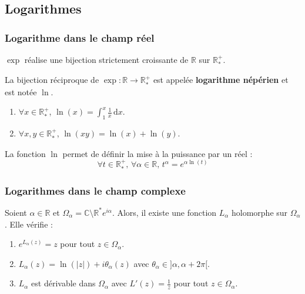   \subsection{Logarithmes}

  \subsubsection{Logarithme dans le champ réel}


  \begin{proposition}
    $\exp$ réalise une bijection strictement croissante de $\mathbb{R}$ sur $\mathbb{R}_*^+$.
  \end{proposition}

  \begin{definition}
    La bijection réciproque de $\exp : \mathbb{R} \rightarrow \mathbb{R}_*^+$ est appelée \textbf{logarithme népérien} et est notée $\ln$.
  \end{definition}

  \begin{theorem}
    \begin{enumerate}[label=(\roman*)]
      \item $\forall x \in \mathbb{R}_*^+$, $\ln(x) = \int_1^x \frac{1}{x} \, \mathrm{d}x$.
      \item $\forall x, y \in \mathbb{R}_*^+$, $\ln(xy) = \ln(x) + \ln(y)$.
    \end{enumerate}
  \end{theorem}

  \begin{remark}
    La fonction $\ln$ permet de définir la mise à la puissance par un réel :
    \[ \forall t \in \mathbb{R}^+_*, \, \forall \alpha \in \mathbb{R}, \, t^\alpha = e^{\alpha \ln(t)} \]
  \end{remark}

  \subsubsection{Logarithmes dans le champ complexe}


  \begin{theorem}
    Soient $\alpha \in \mathbb{R}$ et $\Omega_\alpha = \mathbb{C} \setminus \mathbb{R}^* e^{i\alpha}$. Alors, il existe une fonction $L_\alpha$ holomorphe sur $\Omega_\alpha$. Elle vérifie :
    \begin{enumerate}[label=(\roman*)]
      \item $e^{L_\alpha(z)} = z$ pour tout $z \in \Omega_\alpha$.
      \item $L_\alpha(z) = \ln(\vert z \vert) + i\theta_\alpha(z)$ avec $\theta_\alpha \in ]\alpha, \alpha + 2\pi[$.
      \item $L_\alpha$ est dérivable dans $\Omega_\alpha$ avec $L'(z) = \frac{1}{z}$ pour tout $z \in \Omega_\alpha$.
    \end{enumerate}
  \end{theorem}

